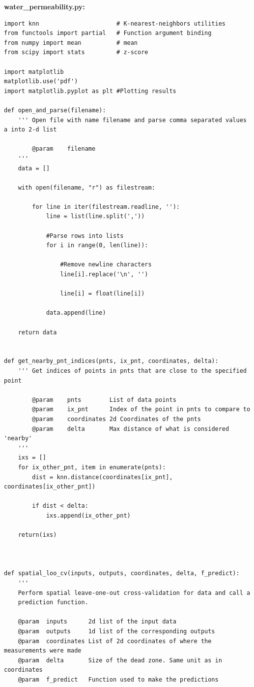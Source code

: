 \documentclass[a4paper]{article}
\begin{document}
\textbf{water\_permeability.py:}\\
\footnotesize
\begin{lstlisting}
import knn                      # K-nearest-neighbors utilities
from functools import partial   # Function argument binding
from numpy import mean          # mean
from scipy import stats         # z-score

import matplotlib 
matplotlib.use('pdf')
import matplotlib.pyplot as plt #Plotting results

def open_and_parse(filename):
    ''' Open file with name filename and parse comma separated values a into 2-d list
        
        @param    filename
    '''
    data = []

    with open(filename, "r") as filestream:

        for line in iter(filestream.readline, ''):
            line = list(line.split(','))

            #Parse rows into lists
            for i in range(0, len(line)):

                #Remove newline characters
                line[i].replace('\n', '')

                line[i] = float(line[i])

            data.append(line)

    return data


def get_nearby_pnt_indices(pnts, ix_pnt, coordinates, delta):
    ''' Get indices of points in pnts that are close to the specified point

        @param    pnts        List of data points
        @param    ix_pnt      Index of the point in pnts to compare to
        @param    coordinates 2d Coordinates of the pnts
        @param    delta       Max distance of what is considered 'nearby'
    '''
    ixs = []
    for ix_other_pnt, item in enumerate(pnts):
        dist = knn.distance(coordinates[ix_pnt], coordinates[ix_other_pnt])

        if dist < delta:
            ixs.append(ix_other_pnt)

    return(ixs)



def spatial_loo_cv(inputs, outputs, coordinates, delta, f_predict):
    '''
    Perform spatial leave-one-out cross-validation for data and call a
    prediction function.

    @param  inputs      2d list of the input data
    @param  outputs     1d list of the corresponding outputs
    @param  coordinates List of 2d coordinates of where the measurements were made
    @param  delta       Size of the dead zone. Same unit as in coordinates
    @param  f_predict   Function used to make the predictions


\end{lstlisting}
\end{document}
